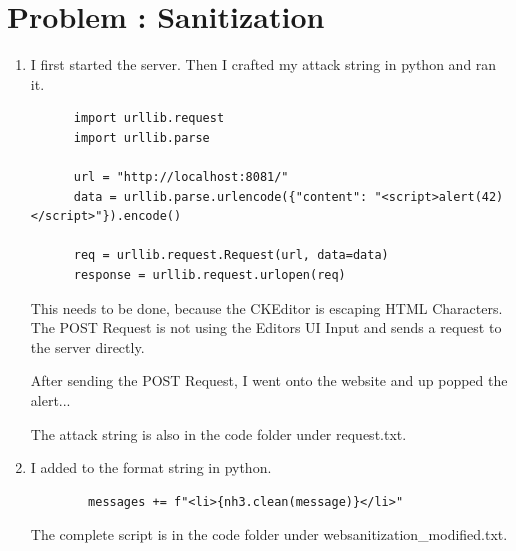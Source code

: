 \documentclass[12pt]{scrartcl}
\newcounter{exnum}
\newcommand{\exercise}[1]{\section*{Problem \theexnum\stepcounter{exnum}: #1}}
\begin{document}
\setcounter{exnum}{1}
\exercise{Sanitization}
\begin{enumerate}
  \item
    I first started the server. Then I crafted my attack string in python and ran it.
    \begin{lstlisting}
      import urllib.request
      import urllib.parse

      url = "http://localhost:8081/"
      data = urllib.parse.urlencode({"content": "<script>alert(42)</script>"}).encode()

      req = urllib.request.Request(url, data=data)
      response = urllib.request.urlopen(req)
    \end{lstlisting}
    
    This needs to be done, because the CKEditor is escaping HTML Characters. The POST Request is not using the Editors UI Input and sends a request to the server directly.

    After sending the POST Request, I went onto the website and up popped the alert...
    
    The attack string is also in the code folder under request.txt.

    \item
      I added to the format string in python.
      \begin{lstlisting}
        messages += f"<li>{nh3.clean(message)}</li>"
      \end{lstlisting}

      The complete script is in the code folder under web\-sanitization\_modified.txt.

\end{enumerate}
\end{document}
